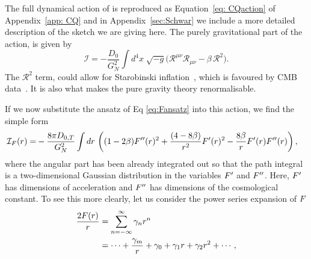 \documentclass[aps,pra,amsmath,amssymb,amsthm,floatfix,nofootinbib,notitlepage,superscriptaddress,10pt]{revtex4-2}
\def\actionC{\mathcal{I}}
\def\actionF{\mathcal{I}_F}
\begin{document}
The full dynamical action of \cite{oppenheim2023covariant} is reproduced as Equation~\eqref{eq: CQaction} of Appendix~\ref{app: CQ} and in Appendix~\ref{sec:Schwar} 
we include a more detailed description of the sketch we are giving here. 
The purely gravitational part of the action, is given by
\begin{equation}
    \actionC=-\frac{D_0}{G_N^2}\int d^4x\;\sqrt{-g}\big(\mathcal{R}^{\mu\nu}\mathcal{R}_{\mu\nu}-\beta\,\mathcal{R}^2 \big).
\end{equation}
The $\mathcal{R}^2$ term, could allow for Starobinski inflation~\cite{starobinsky1980new, vilenkin1985classical,liu2018inflation}, which is favoured by CMB data~\cite{akrami2020planck}. It is also what makes the pure gravity theory renormalisable\cite{grudka2023renormalisable}.

If we now substitute the ansatz of Eq \eqref{eq:Fansatz}
into this action, we find 
 the simple form
\begin{align}
\label{eq:Faction}
 \actionF(r)
  =  &-\frac{8 \pi D_{0,T}}{G_N^2} \int  dr\, \left((1-2 \beta) \Fu''(r)^2+\frac{(4 -8 \beta)}{r^2}  \Fu'(r)^2-\frac{8 \beta }{r}  \Fu'(r)  \Fu''(r)\right),
\end{align}
where the angular part has been already integrated out so that the path integral is a two-dimensional Gaussian distribution in the variables $F'$ and $F''$. 
Here, $F'$ has dimensions of acceleration and $F''$ has dimensions of the cosmological constant. 
To see this more clearly, let us consider the power series expansion of $F$
\begin{align}
\frac{2F(r)}{r}&=\sum_{n=-\infty}^{\infty} \gamma_n r^{n}\nonumber\\
&=\cdots 
+\frac{\gamma_m}{r}
+\gamma_0+\gamma_1 r+\gamma_2 r^2 + \cdots,
\label{eq:powers}
\end{align}
\end{document}
